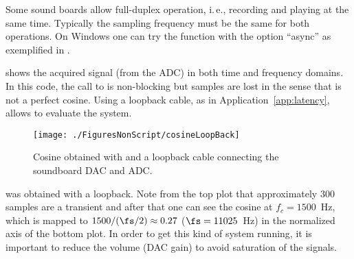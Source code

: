 Some sound boards allow full-duplex operation, i.\,e., recording and playing at the same time. Typically the sampling frequency must be the same for both operations. On Windows one can try the  function with the option ``async'' as exemplified in .



 shows the acquired signal (from the ADC) in both time and frequency domains. In this code, the call to  is non-blocking but samples are lost in the sense that  is not a perfect cosine.
Using a loopback cable, as in Application~\ref{app:latency}, allows to evaluate the system.

\begin{figure}
\centering
\texttt{[image: ./FiguresNonScript/cosineLoopBack]}
\caption{Cosine obtained with   and a loopback cable connecting the soundboard DAC and ADC.\label{fig:cosineLoopBack}}
\end{figure}

 was obtained with a loopback. Note from the top plot that approximately 300 samples are a transient and after that one can see the cosine at $f_c=1500$~Hz, which is mapped to $1500/(\fs/2) \approx 0.27$ ($\fs=11025$~Hz) in the normalized axis of the bottom plot. In order to get this kind of system running, it is important to reduce the volume (DAC gain) to avoid saturation of the signals.


